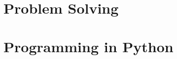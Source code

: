 \documentclass[12pt,twoside]{book}
\begin{document}
\mainmatter

\part{Problem Solving}

\adjustmtc
\adjustmtc
\adjustmtc
\adjustmtc






%
%
%



\part{Programming in Python}




\appendix
\appendixpage
\addappheadtotoc
% 



\backmatter

\printindex
\end{document}
